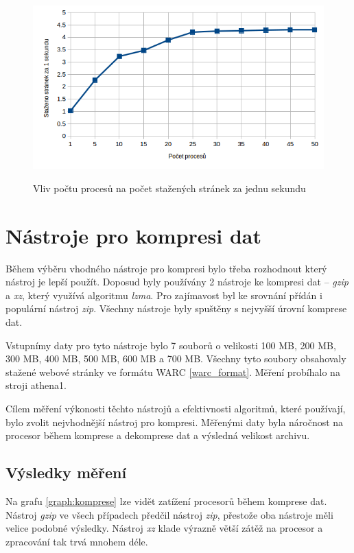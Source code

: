 \begin{figure}[H]
    \begin{center}
        \label{graph:stahovani}
        \includegraphics[width=1.0\textwidth]{obrazky-figures/graph_stahovani.png}
        \caption{Vliv počtu procesů na počet stažených stránek za jednu sekundu}
    \end{center}
\end{figure}

\section{Nástroje pro kompresi dat}
Během výběru vhodného nástroje pro kompresi bylo třeba rozhodnout který nástroj
je lepší použít. Doposud byly používány 2 nástroje ke kompresi dat -- \textit{gzip}
a \textit{xz}, který využívá algoritmu \textit{lzma}. Pro zajímavost byl ke srovnání
přídán i populární nástroj \textit{zip}. Všechny nástroje byly spuštěny s nejvyšší
úrovní komprese dat.

Vstupnímy daty pro tyto nástroje bylo 7 souborů o velikosti 100 MB, 200 MB, 300 MB,
400 MB, 500 MB, 600 MB a 700 MB. Všechny tyto soubory obsahovaly stažené webové
stránky ve formátu WARC \ref{warc_format}. Měření probíhalo na stroji athena1.

Cílem měření výkonosti těchto nástrojů a efektivnosti algoritmů, které používají, bylo
zvolit nejvhodnější nástroj pro kompresi. Měřenými daty byla náročnost na procesor
během komprese a dekomprese dat a výsledná velikost archivu.

\subsection{Výsledky měření}
Na grafu \ref{graph:komprese} lze vidět zatížení procesorů během komprese dat.
Nástroj \textit{gzip}  ve všech případech předčil nástroj \textit{zip}, přestože
oba nástroje měli velice podobné výsledky. Nástroj \textit{xz} klade výrazně
větší zátěž na procesor a zpracování tak trvá mnohem déle.

